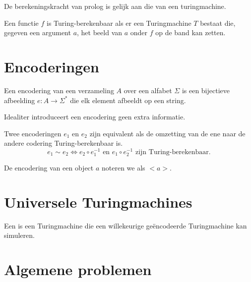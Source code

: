 \documentclass[main.tex]{subfiles}
\begin{document}
\begin{st}
  De berekeningskracht van prolog is gelijk aan die van een turingmachine.
\end{st}


\begin{de}
  Een functie $f$ is Turing-berekenbaar als er een Turingmachine $T$ bestaat die, gegeven een argument $a$, het beeld van $a$ onder $f$ op de band kan zetten.
\end{de}

\section{Encoderingen}
\label{sec:encoderingen}

\begin{de}
  Een encodering van een verzameling $A$ over een alfabet $\Sigma$ is een bijectieve afbeelding $e: A \rightarrow \Sigma^{*}$ die elk element afbeeldt op een string.
\end{de}

\begin{opm}
  Idealiter introduceert een encodering geen extra informatie.
\end{opm}

\begin{de}
  Twee encoderingen $e_{1}$ en $e_{2}$ zijn equivalent als de omzetting van de ene naar de andere codering Turing-berekenbaar is.
  \[ e_{1} \sim e_{2} \Leftrightarrow e_{2} \circ e_{1}^{-1} \text{ en } e_{1} \circ e_{2}^{-1} \text{ zijn Turing-berekenbaar.}\]
\end{de}

\begin{de}
  De encodering van een object $a$ noteren we als $<a>$.
\end{de}

\section{Universele Turingmachines}
\label{sec:univ-turingm}

\begin{de}
  Een  is een Turingmachine die een willekeurige ge\"encodeerde Turingmachine kan simuleren.
\end{de}

\section{Algemene problemen}
\label{sec:algemene-problemen}
\end{document}
